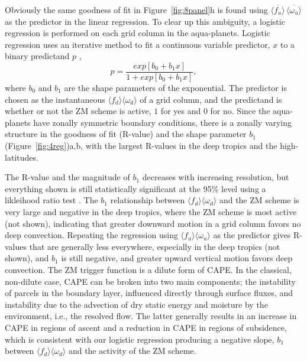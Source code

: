 Obviously the same goodness of fit in Figure~\ref{fig:8panel}h is found using $\overline{\langle f_{u} \rangle} \, \overline{\langle \omega_{u} \rangle}$ as the predictor in the linear regression. To clear up this ambiguity, a logistic regression is performed on each grid column in the aqua-planets. Logistic regression uses an iterative method to fit a continuous variable predictor, $x$ to a binary predictand $p$ \citep{},
\begin{equation}
p = \frac{exp{[b_0 + b_1 x]}}{1 + exp{[b_0 + b_1 x]}}, \label{eq:eq6-3}
\end{equation}
where $b_0$ and $b_1$ are the shape parameters of the exponential. The predictor is chosen as the instantaneous $\langle f_{d} \rangle \langle \omega_{d} \rangle$ of a grid column, and the predictand is whether or not the ZM scheme is active, $1$ for yes and $0$ for no. Since the aqua-planets have zonally symmetric boundary conditions, there is a zonally varying structure in the goodness of fit (R-value) and the shape parameter $b_1$ (Figure~\ref{fig:4reg})a,b, with the largest R-values in the deep tropics and the high-latitudes. 

The R-value and the magnitude of $b_1$ decreases with increasing resolution, but everything shown is still statistically significant at the 95\% level using a likleihood ratio test \citep{}. The $b_1$ relationship between $\langle f_{d} \rangle \langle \omega_{d} \rangle$ and the ZM scheme is very large and negative in the deep tropics, where the ZM scheme is most active (not shown), indicating that greater downward motion in a grid column favors no deep convection. Repeating the regression using $\langle f_{u} \rangle \langle \omega_{u} \rangle$ as the predictor gives R-values that are generally less everywhere, especially in the deep tropics (not shown), and $b_1$ is still negative, and greater upward vertical motion favors deep convection.
The ZM trigger function is a dilute form of CAPE. In the classical, non-dilute case, CAPE can be broken into two main components; the instability of parcels in the boundary layer, influenced directly through surface fluxes, and instability due to the advection of dry static energy and moisture by the environment, i.e., the resolved flow. The latter generally results in an increase in CAPE in regions of ascent and a reduction in CAPE in regions of subsidence, which is consistent with our logistic regression producing a negative slope, $b_1$ between $\langle f_{d} \rangle \langle \omega_{d} \rangle$ and the activity of the ZM scheme.

